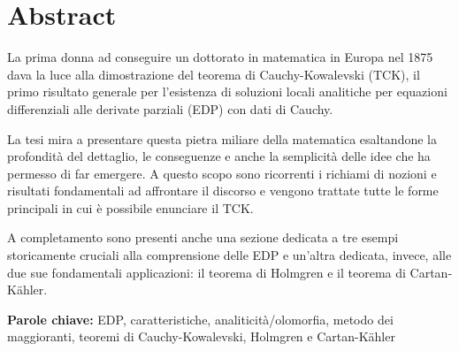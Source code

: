 \chapter*{Abstract}

La prima donna ad conseguire un dottorato in matematica in Europa nel 1875 dava la luce alla dimostrazione del teorema di Cauchy-Kowalevski (TCK), il primo risultato generale per l'esistenza di soluzioni locali analitiche per equazioni differenziali alle derivate parziali (EDP) con dati di Cauchy.

\vspace{6mm}
La tesi mira a presentare questa pietra miliare della matematica esaltandone la profondità del dettaglio, le conseguenze e anche la semplicità delle idee che ha permesso di far emergere. A questo scopo sono ricorrenti i richiami di nozioni e risultati fondamentali ad affrontare il discorso e vengono trattate tutte le forme principali in cui è possibile enunciare il TCK.

\vspace{6mm}
A completamento sono presenti anche una sezione dedicata a tre esempi storicamente cruciali alla comprensione delle EDP e un'altra dedicata, invece, alle due sue fondamentali applicazioni: il teorema di Holmgren e il teorema di Cartan-Kähler.

\vspace{6mm}
\textbf{Parole chiave:} EDP, caratteristiche, analiticità/olomorfia, metodo dei maggioranti, teoremi di Cauchy-Kowalevski, Holmgren e Cartan-Kähler

\newpage
\blankpage